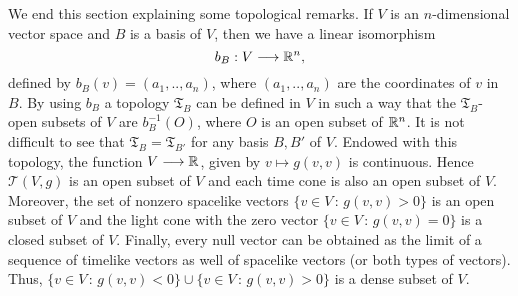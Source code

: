 We end this section explaining some topological remarks. If $V$ is an $n$-dimensional vector space and $B$ is a basis of $V$, then we have a linear isomorphism $$b_B : V \longrightarrow \mathbb{R}^n,$$ defined by $b_B(v)=(a_1,..,a_n)$, where $(a_1,..,a_n)$ are the coordinates of $v$ in $B$. By using $b_B$ a topology $\mathfrak{T}_B$ can be defined in $V$ in such a way that the $\mathfrak{T}_B$-open subsets of $V$ are $b_B^{-1}(O)$, where $O$ is an open subset of $\mathbb{R}^n$. It is not difficult to see that $\mathfrak{T}_B = \mathfrak{T}_{B'}$ for any basis $B,B'$ of $V$. Endowed with this topology, the function $V \longrightarrow \mathbb{R}$, given by $v \mapsto g(v,v)$ is continuous. Hence $\mathcal{T}(V,g)$ is an open subset of $V$ and each time cone is also an open subset of $V$. Moreover, the set of nonzero spacelike vectors $\{v\in V \, : \, g(v,v)>0 \}$ is an open subset of $V$ and the light cone with the zero vector $\{v\in V \, : \, g(v,v)=0 \}$ is a closed subset of $V$. Finally, every null vector can be obtained as the limit of a sequence of timelike vectors as well of spacelike vectors (or both types of vectors). Thus, $\{v\in V \, : \, g(v,v)<0 \} \cup \{v\in V \, : \, g(v,v)>0 \}$
is a dense subset of $V$.
